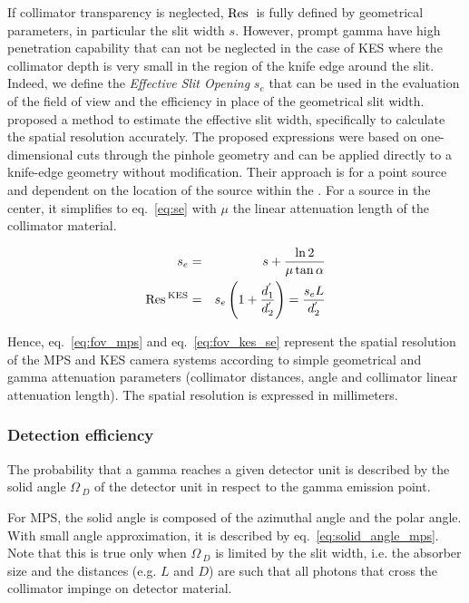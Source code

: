 \documentclass[a4paper,english]{article}
\begin{document}
If collimator transparency is neglected, $\textrm{Res}\,_{}$ is fully defined by geometrical parameters, in particular the slit width $s$. However, prompt gamma have high penetration capability that can not be neglected in the case of KES where the collimator depth is very small in the region of the knife edge around the slit. Indeed, we define the \textit{Effective Slit Opening} $s_e$ that can be used in the evaluation of the field of view and the efficiency in place of the geometrical slit width. \cite{Metzler2005}
proposed a method to estimate the effective slit width, specifically to calculate
the spatial resolution accurately. The proposed expressions were based on
one-dimensional cuts through the pinhole geometry and can be applied directly to
a knife-edge geometry without modification. Their approach is for a point source
and dependent on the location of the source within the \FOV. For a source in the
center, it simplifies to eq.~\ref{eq:se} with $\mu$ the linear attenuation
length of the collimator material.

\begin{eqnarray}
  s_e & = & s + \frac{\ln2}{\mu\tan\alpha}   \label{eq:se} \\
   \textrm{Res}\,_{}^{\textrm{KES}} & = & s_e\left(1+ \frac{d_1^{'}}{d_2^{'}}\right) = \frac{s_eL}{d_2^{'}}          
  \label{eq:fov_kes_se}
\end{eqnarray}

Hence, eq.~\ref{eq:fov_mps} and eq.~\ref{eq:fov_kes_se} represent the spatial resolution of the MPS and KES camera systems according to simple geometrical and gamma attenuation parameters (collimator distances, angle and collimator linear attenuation length). The spatial resolution is expressed in millimeters. 

\subsubsection{Detection efficiency}

The probability that a gamma reaches a given detector unit is described by the solid angle $\Omega\,_D$ of the detector unit in respect to the gamma emission point. 

For MPS, the solid angle is composed of the azimuthal angle and the polar angle. With small angle approximation, it is described by
eq.~\ref{eq:solid_angle_mps}. Note that this is true only when $\Omega\,_D$ is
limited by the slit width, i.e. the absorber size and the distances (e.g. $L$ and $D$) are such that
all photons that cross the collimator impinge on detector material. 
\end{document}
